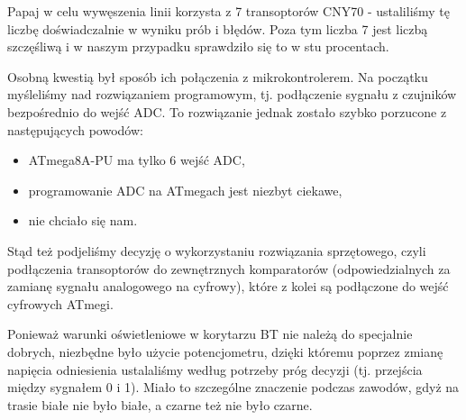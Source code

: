 Papaj w celu wywęszenia linii korzysta z 7 transoptorów CNY70 - ustaliliśmy tę liczbę doświadczalnie w wyniku prób i błędów. Poza tym liczba 7 jest liczbą szczęśliwą i w naszym przypadku sprawdziło się to w stu procentach.

Osobną kwestią był sposób ich połączenia z mikrokontrolerem. Na początku myśleliśmy nad rozwiązaniem programowym, tj. podłączenie sygnału z czujników bezpośrednio do wejść ADC. To rozwiązanie jednak zostało szybko porzucone z następujących powodów:
\begin{itemize}
\item ATmega8A-PU ma tylko 6 wejść ADC,
\item programowanie ADC na ATmegach jest niezbyt ciekawe,
\item nie chciało się nam.
\end{itemize}

Stąd też podjeliśmy decyzję o wykorzystaniu rozwiązania sprzętowego, czyli podłączenia transoptorów do zewnętrznych komparatorów (odpowiedzialnych za zamianę sygnału analogowego na cyfrowy), które z kolei są podłączone do wejść cyfrowych ATmegi. 

Ponieważ warunki oświetleniowe w korytarzu BT nie należą do specjalnie dobrych, niezbędne było użycie potencjometru, dzięki któremu poprzez zmianę napięcia odniesienia ustalaliśmy według potrzeby próg decyzji (tj. przejścia między sygnałem 0 i 1). Miało to szczególne znaczenie podczas zawodów, gdyż na trasie białe nie było białe, a czarne też nie było czarne. 